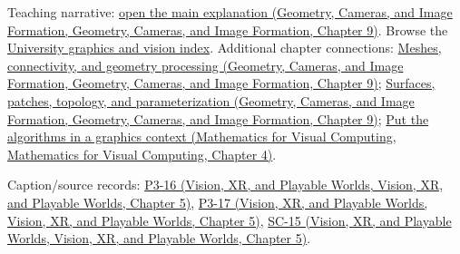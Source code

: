 Teaching narrative: \href{../03-Geometry-Cameras-and-Image-Formation/main.pdf\#nameddest=03-visual-computing-i-ch002-meshes-connectivity-and-geometry-processing}{open the main explanation (Geometry, Cameras, and Image Formation, Geometry, Cameras, and Image Formation, Chapter 9)}. Browse the \hyperref[appendix-a6d556a4ef50-university-graphics-vision-and-photography---independent-series]{University graphics and vision index}. Additional chapter connections: \href{../03-Geometry-Cameras-and-Image-Formation/main.pdf\#nameddest=03-visual-computing-i-ch002-meshes-connectivity-and-geometry-processing}{Meshes, connectivity, and geometry processing (Geometry, Cameras, and Image Formation, Geometry, Cameras, and Image Formation, Chapter 9)}; \href{../03-Geometry-Cameras-and-Image-Formation/main.pdf\#nameddest=03-visual-computing-i-ch002-surfaces-patches-topology-and-parameterization}{Surfaces, patches, topology, and parameterization (Geometry, Cameras, and Image Formation, Geometry, Cameras, and Image Formation, Chapter 9)}; \href{../02-Mathematics-for-Visual-Computing/main.pdf\#nameddest=01-foundations-i-ch020-put-the-algorithms-in-a-graphics-context}{Put the algorithms in a graphics context (Mathematics for Visual Computing, Mathematics for Visual Computing, Chapter 4)}.

Caption/source records: \href{../07-Vision-XR-and-Playable-Worlds/main.pdf\#nameddest=04-visual-computing-ii-ch036-p3-16---subdivision-surfaces-part-1}{P3-16 (Vision, XR, and Playable Worlds, Vision, XR, and Playable Worlds, Chapter 5)}, \href{../07-Vision-XR-and-Playable-Worlds/main.pdf\#nameddest=04-visual-computing-ii-ch036-p3-17---subdivision-surfaces-part-2}{P3-17 (Vision, XR, and Playable Worlds, Vision, XR, and Playable Worlds, Chapter 5)}, \href{../07-Vision-XR-and-Playable-Worlds/main.pdf\#nameddest=04-visual-computing-ii-ch036-sc-15---stanford-cs231n-deep-learning-for-computer-vision-spring-2025-lecture-15-3d-vision}{SC-15 (Vision, XR, and Playable Worlds, Vision, XR, and Playable Worlds, Chapter 5)}.
